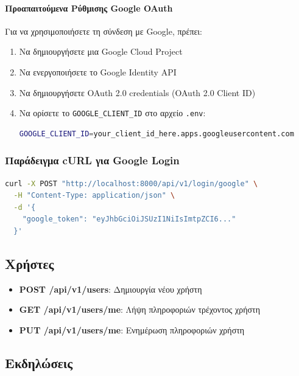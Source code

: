 \documentclass[12pt,a4paper]{report}
\begin{document}
\paragraph{Προαπαιτούμενα Ρύθμισης Google OAuth}

Για να χρησιμοποιήσετε τη σύνδεση με Google, πρέπει:

\begin{enumerate}
    \item Να δημιουργήσετε μια Google Cloud Project
    \item Να ενεργοποιήσετε το Google Identity API
    \item Να δημιουργήσετε OAuth 2.0 credentials (OAuth 2.0 Client ID)
    \item Να ορίσετε το \texttt{GOOGLE\_CLIENT\_ID} στο αρχείο \texttt{.env}:
    \begin{lstlisting}[language=bash]
GOOGLE_CLIENT_ID=your_client_id_here.apps.googleusercontent.com
    \end{lstlisting}
\end{enumerate}

\subsubsection{Παράδειγμα cURL για Google Login}

\begin{lstlisting}[language=bash, caption=Google Login Request]
curl -X POST "http://localhost:8000/api/v1/login/google" \
  -H "Content-Type: application/json" \
  -d '{
    "google_token": "eyJhbGciOiJSUzI1NiIsImtpZCI6..."
  }'
\end{lstlisting}

\subsection{Χρήστες}

\begin{itemize}
    \item \textbf{POST /api/v1/users}: Δημιουργία νέου χρήστη
    \item \textbf{GET /api/v1/users/me}: Λήψη πληροφοριών τρέχοντος χρήστη
    \item \textbf{PUT /api/v1/users/me}: Ενημέρωση πληροφοριών χρήστη
\end{itemize}

\subsection{Εκδηλώσεις}
\end{document}
